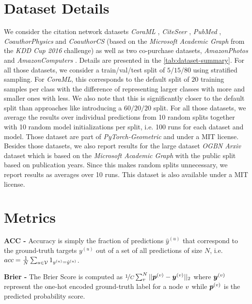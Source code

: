 \section{Dataset Details} \label{sec:app_dataset_details}
We consider the citation network datasets \emph{CoraML} \citep{Mccallum2000, Giles1998, Getoor2005, Sen2008a, Bojchevski2017}, \emph{CiteSeer} \citep{Giles1998, Getoor2005, Sen2008a}, \emph{PubMed} \citep{Namata2012}, \emph{CoauthorPhysics} and \emph{CoauthorCS} (based on the \emph{Microsoft Academic Graph} from the \emph{KDD Cup 2016} challenge) \citep{Shchur2018}
as well as two co-purchase datasets, \emph{AmazonPhotos} and \emph{AmazonComputers} \citep{Mcauley2015, Shchur2018}. Details are presented in the \cref{tab:dataset-summary}. For all those datasets, we consider a train/val/test split of $5/15/80$ using stratified sampling. For \emph{CoraML}, this corresponds to the default split of $20$ training samples per class with the difference of representing larger classes with more and smaller ones with less. We also note that this is significantly closer to the default split than approaches like \citep{Wang2020, Huang2020} introducing a $60/20/20$ split. For all those datasets, we average the results over individual predictions from 10 random splits together with 10 random model initializations per split, i.e. 100 runs for each dataset and model. Those dataset are part of \emph{PyTorch-Geometric} and under a MIT license. Besides those datasets, we also report results for the large dataset \emph{OGBN Arxiv} dataset \citep{ogb-dataset} which is based on the \emph{Microsoft Academic Graph} \citep{microsoft-academic-graph} with the public split based on publication years. Since this makes random splits unnecessary, we report results as averages over 10 runs. This dataset is also available under a MIT license.



\section{Metrics} \label{sec:app_metrics}
\textbf{ACC - } Accuracy is simply the fraction of predictions $\hat{y}^{(u)}$ that correspond to the ground-truth targets $y^{(u)}$ out of a set of all predictions of size $N$, i.e. $acc = \frac{1}{N}\sum_{u\in \mathcal{V}} 1_{y^{(u)} = \hat{y}^{(u)}}$.

\textbf{Brier - } The Brier Score is computed as $\nicefrac{1}{C}\sum_v^N ||\bm{p}^{(v)} - \bm{y}^{(v)}||_2$ where $\bm{y}^{(v)}$ represent the one-hot encoded ground-truth label for a node $v$ while $\bm{p}^{(v)}$ is the predicted probability score. 

